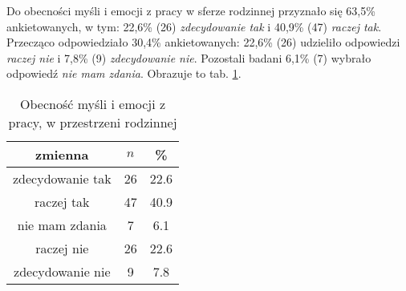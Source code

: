  Do obecności myśli i emocji z pracy w sferze rodzinnej przyznało się 63,5\% ankietowanych, w tym: 22,6\% (26) \textit{zdecydowanie tak} i 40,9\% (47) \textit{raczej tak}. Przecząco odpowiedziało 30,4\% ankietowanych: 22,6\% (26) udzieliło odpowiedzi \textit{raczej nie} i 7,8\% (9) \textit{zdecydowanie nie}. Pozostali badani 6,1\% (7) wybrało odpowiedź \textit{nie mam zdania}. Obrazuje to tab. \ref{tab:Q10}.

\begin{table}[H]
\caption{Obecność myśli i emocji z pracy, w przestrzeni rodzinnej}
\centering
\begin{tabular}{ | c | c | c |}
\hline
zmienna & $n$ & \% \\
\hline
zdecydowanie tak  &  26  & 22.6\\
\hline
raczej tak  &  47  & 40.9 \\
\hline
nie mam zdania  &  7  & 6.1\\
\hline
raczej nie  &  26  & 22.6\\
\hline
zdecydowanie nie  &  9  & 7.8 \\
\hline
\end{tabular}
\label{tab:Q10}
\end{table}


